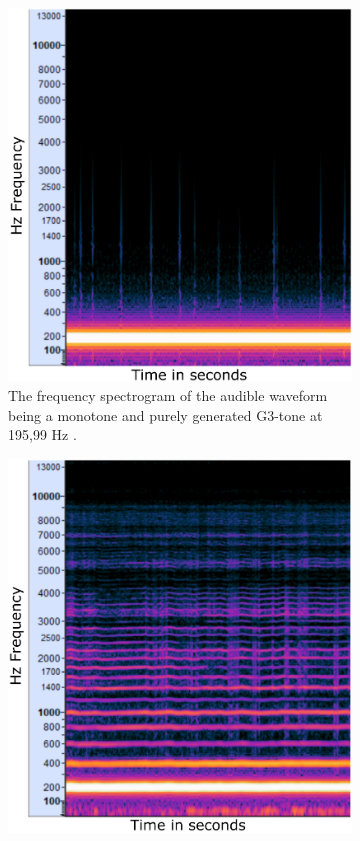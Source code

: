		\begin{figure}[ht!]
			\centering
				\begin{subfigure}[t]{.5\textwidth}
					\centering\captionsetup{width=.9\linewidth}%
					\includegraphics[width=0.9\linewidth]{Assets/Figures/G3_196Hz_PureTone_waveform_spectrogram.pdf}
					\caption{The frequency spectrogram of the audible waveform being a monotone and purely generated G3-tone at 195,99 Hz \cite{generate_tones}.}
					\label{fig:sub:G3_pure_waveform}
				\end{subfigure}%
				\begin{subfigure}[t]{.5\textwidth}
					\centering\captionsetup{width=.9\linewidth}%
					\includegraphics[width=0.9\linewidth]{Assets/Figures/G3_196Hz_HummingWaveform_FrequencySpectrum.pdf}

\end{subfigure}
\end{figure}
